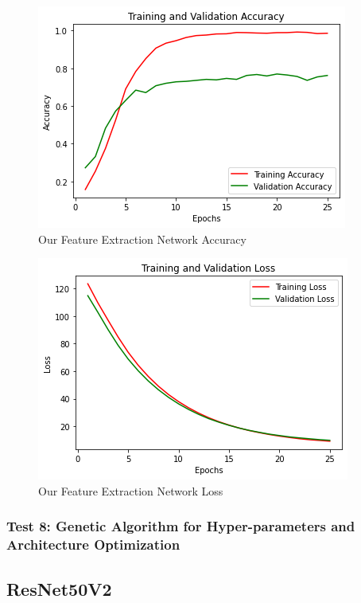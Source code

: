 \medskip

\begin{figure}[H]
	\centering
	\includegraphics[height=0.45\textwidth]{img/vgg16ft2dropregacc.png}
	\caption{Our Feature Extraction Network Accuracy}
	\label{fig:vgg16ft2dropregacc}
\end{figure}

\begin{figure}[H]
	\centering
	\includegraphics[height=0.45\textwidth]{img/vgg16ft2dropregloss.png}
	\caption{Our Feature Extraction Network Loss}
	\label{fig:vgg16ft2dropregloss}
\end{figure}









\subsubsection{Test 8: Genetic Algorithm for Hyper-parameters and Architecture Optimization}





\subsection{ResNet50V2}

